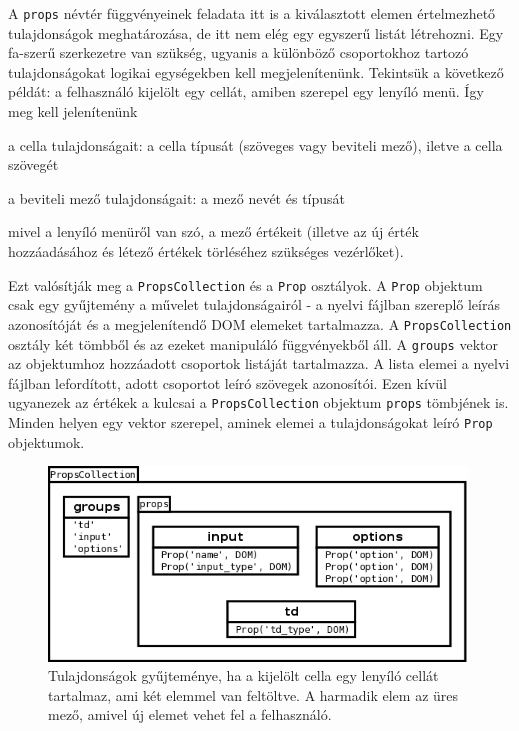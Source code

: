 \documentclass[12pt,a4paper,twoside]{article}
\newcommand{\desc}{
  \begin{description}{}{}
    \setlength\itemsep{0pt}
    \setlength\parskip{0pt}
    \setlength\topsep{0pt}
    \setlength\partopsep{0pt}
    \small}
\newcommand{\ed}{
  \end{description}
}
\begin{document}
A \texttt{props} névtér függvényeinek feladata itt is a kiválasztott elemen
értelmezhető tulajdonságok meghatározása, de itt nem elég egy egyszerű listát
létrehozni. Egy fa-szerű szerkezetre van szükség, ugyanis a különböző
csoportokhoz tartozó tulajdonságokat logikai egységekben kell
megjelenítenünk. Tekintsük a következő példát: a felhasználó kijelölt egy
cellát, amiben szerepel egy lenyíló menü. Így meg kell jelenítenünk
\desc
\item[a cella tulajdonságait:] a cella típusát (szöveges vagy beviteli mező),
  iletve a cella szövegét
\item[a beviteli mező tulajdonságait:] a mező nevét és típusát
\item mivel a lenyíló menüről van szó, a mező értékeit (illetve az új érték
  hozzáadásához és létező értékek törléséhez szükséges vezérlőket).
\ed

Ezt valósítják meg a \texttt{PropsCollection} és a \texttt{Prop} osztályok. A
\texttt{Prop} objektum csak egy gyűjtemény a művelet tulajdonságairól - a nyelvi
fájlban szereplő leírás azonosítóját és a megjelenítendő DOM elemeket
tartalmazza. A \texttt{PropsCollection} osztály két tömbből és az ezeket
manipuláló függvényekből áll. A \texttt{groups} vektor az objektumhoz hozzáadott
csoportok listáját tartalmazza. A lista elemei a nyelvi fájlban lefordított,
adott csoportot leíró szövegek azonosítói. Ezen kívül ugyanezek az értékek a
kulcsai a \texttt{PropsCollection} objektum \texttt{props} tömbjének is. Minden
helyen egy vektor szerepel, aminek elemei a tulajdonságokat leíró \texttt{Prop}
objektumok.

\begin{figure}[H]
  \centering
  \includegraphics[width=420px]{PropsCollection.png}
  \caption{Tulajdonságok gyűjteménye, ha a kijelölt cella egy lenyíló cellát
    tartalmaz, ami két elemmel van feltöltve. A harmadik elem az üres mező,
    amivel új elemet vehet fel a felhasználó.}\label{fig:props_collection}
\end{figure}
\end{document}
